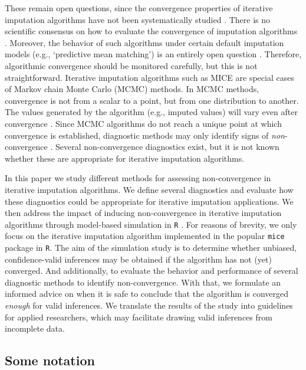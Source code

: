 \documentclass[Royal,times,sageh]{sagej}
\begin{document}
These remain open questions, since the convergence properties of iterative imputation algorithms have not been systematically studied \citep{zhu15, buur18}. There is no scientific consensus on how to evaluate the convergence of imputation algorithms \citep{taka17}. Moreover, the behavior of such algorithms under certain default imputation models (e.g., `predictive mean matching') is an entirely open question \citep{murr18}. Therefore, algorithmic convergence should be monitored carefully, but this is not straightforward. Iterative imputation algorithms such as MICE are special cases of Markov chain Monte Carlo (MCMC) methods. In MCMC methods, convergence is not from a scalar to a point, but from one distribution to another. The values generated by the algorithm (e.g., imputed values) will vary even after convergence \citep{gelm13}. Since MCMC algorithms do not reach a unique point at which convergence is established, diagnostic methods may only identify signs of \emph{non}-convergence \citep{hoff09}. Several non-convergence diagnostics exist, but it is not known whether these are appropriate for iterative imputation algorithms.

In this paper we study different methods for assessing non-convergence in iterative imputation algorithms. We define several diagnostics and evaluate how these diagnostics could be appropriate for iterative imputation applications. We then address the impact of inducing non-convergence in iterative imputation algorithms through model-based simulation in \texttt{R} \citep{R}. For reasons of brevity, we only focus on the iterative imputation algorithm implemented in the popular \texttt{mice} package \citep{mice} in \texttt{R}. The aim of the simulation study is to determine whether unbiased, confidence-valid inferences may be obtained if the algorithm has not (yet) converged. And additionally, to evaluate the behavior and performance of several diagnostic methods to identify non-convergence. With that, we formulate an informed advice on when it is safe to conclude that the algorithm is converged \emph{enough} for valid inferences. We translate the results of the study into guidelines for applied researchers, which may facilitate drawing valid inferences from incomplete data.

\hypertarget{some-notation}{%
\subsection{Some notation}\label{some-notation}}
\end{document}
